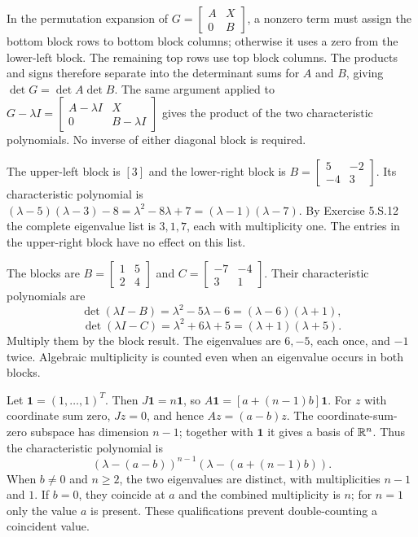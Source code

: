 In the permutation expansion of
$G=\begin{bmatrix}A&X\\0&B\end{bmatrix}$, a nonzero term must
assign the bottom block rows to bottom block columns; otherwise it
uses a zero from the lower-left block. The remaining top rows use
top block columns. The products and signs therefore separate into
the determinant sums for $A$ and $B$, giving $\det G=\det A\det B$.
The same argument applied to
$G-\lambda I=\begin{bmatrix}A-\lambda I&X\\0&B-\lambda I\end{bmatrix}$
gives the product of the two characteristic polynomials. No inverse
of either diagonal block is required.

The upper-left block is $[3]$ and the lower-right block is
$B=\begin{bmatrix}5&-2\\-4&3\end{bmatrix}$.
Its characteristic polynomial is
$(\lambda-5)(\lambda-3)-8=\lambda^2-8\lambda+7
=(\lambda-1)(\lambda-7)$.
By Exercise 5.S.12 the complete eigenvalue list is $3,1,7$,
each with multiplicity one. The entries in the upper-right block
have no effect on this list.

The blocks are $B=\begin{bmatrix}1&5\\2&4\end{bmatrix}$ and
$C=\begin{bmatrix}-7&-4\\3&1\end{bmatrix}$.
Their characteristic polynomials are
\[\det(\lambda I-B)=\lambda^2-5\lambda-6=(\lambda-6)(\lambda+1),\]
\[\det(\lambda I-C)=\lambda^2+6\lambda+5=(\lambda+1)(\lambda+5).\]
Multiply them by the block result. The eigenvalues are $6,-5$,
each once, and $-1$ twice. Algebraic multiplicity is counted even
when an eigenvalue occurs in both blocks.

Let $\mathbf1=(1,\ldots,1)^T$. Then $J\mathbf1=n\mathbf1$,
so $A\mathbf1=[a+(n-1)b]\mathbf1$.
For $z$ with coordinate sum zero, $Jz=0$, and hence
$Az=(a-b)z$. The coordinate-sum-zero subspace has dimension
$n-1$; together with $\mathbf1$ it gives a basis of $\mathbb{R}^n$.
Thus the characteristic polynomial is
\[(\lambda-(a-b))^{n-1}(\lambda-(a+(n-1)b)).\]
When $b\ne0$ and $n\ge2$, the two eigenvalues are distinct, with
multiplicities $n-1$ and $1$. If $b=0$, they coincide at $a$ and
the combined multiplicity is $n$; for $n=1$ only the value $a$
is present. These qualifications prevent double-counting a coincident
value.

